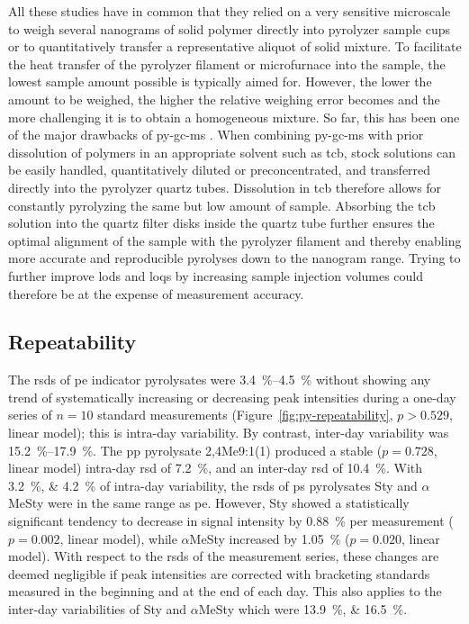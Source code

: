 All these studies have in common that they relied on a very sensitive microscale to weigh several nanograms of solid polymer directly into pyrolyzer sample cups or to quantitatively transfer a representative aliquot of solid mixture. To facilitate the heat transfer of the pyrolyzer filament or microfurnace into the sample, the lowest sample amount possible is typically aimed for. However, the lower the amount to be weighed, the higher the relative weighing error becomes and the more challenging it is to obtain a homogeneous mixture. So far, this has been one of the major drawbacks of \ac{py-gc-ms} \citep{FischerMicroplastics2019}.
When combining \ac{py-gc-ms} with prior dissolution of polymers in an appropriate solvent such as \ac{tcb}, stock solutions can be easily handled, quantitatively diluted or preconcentrated, and transferred directly into the pyrolyzer quartz tubes. Dissolution in \ac{tcb} therefore allows for constantly pyrolyzing the same but low amount of sample. Absorbing the \ac{tcb} solution into the quartz filter disks inside the quartz tube further ensures the optimal alignment of the sample with the pyrolyzer filament and thereby enabling more accurate and reproducible pyrolyses down to the nanogram range. Trying to further improve \acp{lod} and \acp{loq} by increasing sample injection volumes could therefore be at the expense of measurement accuracy.

\subsection{Repeatability}

The \acp{rsd} of \ac{pe} indicator pyrolysates were \SIrange{3.4}{4.5}{\percent} without showing any trend of systematically increasing or decreasing peak intensities during a one-day series of $n = 10$ standard measurements (Figure~\ref{fig:py-repeatability}, $p > 0.529$, linear model); this is intra-day variability. By contrast, inter-day variability was \SIrange{15.2}{17.9}{\percent}. The \ac{pp} pyrolysate 2,4Me9:1(1) produced a stable ($p = 0.728$, linear model) intra-day \ac{rsd} of \SI{7.2}{\percent}, and an inter-day \ac{rsd} of \SI{10.4}{\percent}. With \SIlist{3.2;4.2}{\percent} of intra-day variability, the \acp{rsd} of \ac{ps} pyrolysates Sty and $\alpha$MeSty were in the same range as \ac{pe}.  However, Sty showed a statistically significant tendency to decrease in signal intensity by \SI{0.88}{\percent} per measurement ($p = 0.002$, linear model), while $\alpha$MeSty increased by \SI{1.05}{\percent} ($p = 0.020$, linear model). With respect to the \acp{rsd} of the measurement series, these changes are deemed negligible if peak intensities are corrected with bracketing standards measured in the beginning and at the end of each day. This also applies to the inter-day variabilities of Sty and $\alpha$MeSty which were  \SIlist{13.9;16.5}{\percent}.

